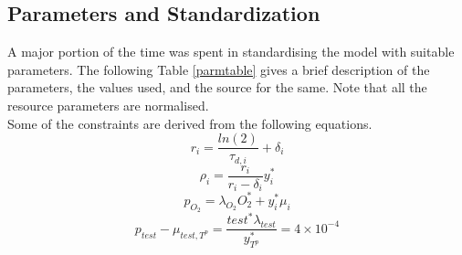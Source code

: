 \documentclass[11pt,a4paper]{article}
\begin{document}
\subsection{Parameters and Standardization}
A major portion of the time was spent in standardising the model with suitable parameters. The following Table \ref{parmtable} gives a brief description of the parameters, the values used, and the source for the same. Note that all the resource parameters are normalised.\\
Some of the constraints are derived from the following equations.
\begin{equation}
  r_i = \frac{ln(2)}{\tau_{d,i}} + \delta_i
  \label{r_eq}
\end{equation}
\begin{equation}
  \rho_i=\frac{r_i}{r_i-\delta_i} y_i^*
  \label{rho_eq}
\end{equation}
\begin{equation}
  p_{O_2} = \lambda_{O_2} O_2^* + y_i^* \mu_i
  \label{p_o2_eq}
\end{equation}
\begin{equation}
  p_{test} - \mu_{test,T^p} = \frac{test^* \lambda_{test}}{y_{T^p}^*} = 4 \times 10^{-4}
  \label{p_test_eq}
\end{equation}
\end{document}
